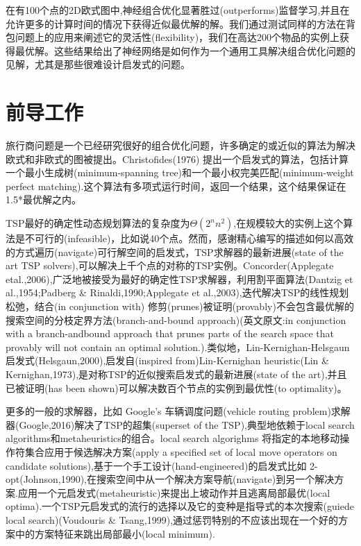\documentclass[a4paper,UTF8]{ctexart}
\theoremstyle{definition}
\begin{document}
在有100个点的2D欧式图中,神经组合优化显著胜过(outperforms)监督学习,并且在允许更多的计算时间的情况下获得近似最优解的解。我们通过测试同样的方法在背包问题上的应用来阐述它的灵活性(flexibility)，我们在高达200个物品的实例上获得最优解。这些结果给出了神经网络是如何作为一个通用工具解决组合优化问题的见解，尤其是那些很难设计启发式的问题。

\section{前导工作}
旅行商问题是一个已经研究很好的组合优化问题，许多确定的或近似的算法为解决欧式和非欧式的图被提出。Christofides(1976) 提出一个启发式的算法，包括计算一个最小生成树(minimum-spanning tree)和一个最小权完美匹配(minimum-weight perfect matching).这个算法有多项式运行时间，返回一个结果，这个结果保证在1.5*最优解之内。

TSP最好的确定性动态规划算法的复杂度为$\Theta(2^nn^2)$,在规模较大的实例上这个算法是不可行的(infeasible)，比如说40个点。然而，感谢精心编写的描述如何以高效的方式遍历(navigate)可行解空间的启发式，TSP求解器的最新进展(state of the art TSP solvers),可以解决上千个点的对称的TSP实例。Concorder(Applegate etal.,2006),广泛地被接受为最好的确定性TSP求解器，利用割平面算法(Dantzig et al.,1954;Padberg \& Rinaldi,1990;Applegate et al.,2003),迭代解决TSP的线性规划松弛，结合(in conjunction with) 修剪(prunes)被证明(provably)不会包含最优解的搜索空间的分枝定界方法(branch-and-bound approach)(英文原文:in conjunction with a branch-andbound approach that prunes parts of the search space that provably will not contain an optimal solution.).类似地，Lin-Kernighan-Helsgaun 启发式(Helsgaun,2000),启发自(inspired from)Lin-Kernighan heuristic(Lin \& Kernighan,1973),是对称TSP的近似搜索启发式的最新进展(state of the art),并且已被证明(has been shown)可以解决数百个节点的实例到最优性(to optimality)。

更多的一般的求解器，比如 Google's  车辆调度问题(vehicle routing problem)求解器(Google,2016)解决了TSP的超集(superset of the TSP),典型地依赖于local search algorithms和metaheuristics的组合。local search algorighms 将指定的本地移动操作符集合应用于候选解决方案(apply a specified set of local move operators on candidate solutions),基于一个手工设计(hand-engineered)的启发式比如 2-opt(Johnson,1990),在搜索空间中从一个解决方案导航(navigate)到另一个解决方案.应用一个元启发式(metaheuristic)来提出上坡动作并且逃离局部最优(local optima).一个TSP元启发式的流行的选择以及它的变种是指导式的本次搜索(guiede local search)(Voudouris \& Tsang,1999),通过惩罚特别的不应该出现在一个好的方案中的方案特征来跳出局部最小(local minimum).
\end{document}
